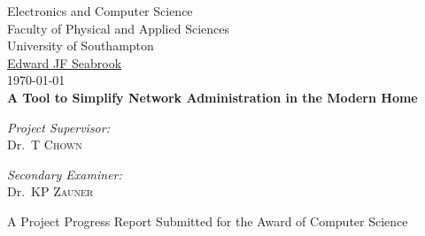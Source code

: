 
\begin{titlepage}

\begin{center}



\LARGE Electronics and Computer Science\\
Faculty of Physical and Applied Sciences\\
University of Southampton
\\[1.5cm]

\href{mailto:ejfs1g10@ecs.soton.ac.uk}{Edward JF Seabrook}\\[0.5cm]

\today \\[1cm]
{\bfseries A Tool to Simplify Network Administration in the Modern Home}\\[1.5cm]

\vfill

\begin{minipage}{0.4\textwidth}
\begin{flushleft} \large
\emph{Project Supervisor:} \\
Dr.~T \textsc{Chown}
\end{flushleft}
\end{minipage}
\begin{minipage}{0.4\textwidth}
\begin{flushright} \large
\emph{Secondary Examiner:}\\
Dr.~KP \textsc{Zauner} 
\end{flushright}
\end{minipage} 

\vfill

A Project Progress Report Submitted for the Award of Computer Science

\end{center}

\end{titlepage}
